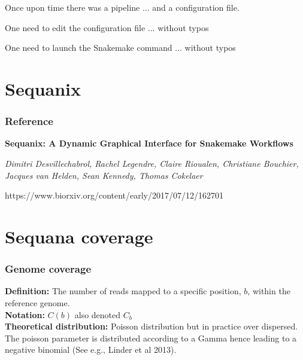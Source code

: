 \documentclass{beamer}
\begin{document}
\begin{frame}
 
Once upon time there was a pipeline ... and a configuration file.

\vspace{1cm}
\pause


One need to edit the configuration file ... without typos 
 
 \vspace{1cm}
\pause

One need to launch the Snakemake command ... without typos
 
\end{frame}


\section{Sequanix}


\begin{frame}
\frametitle{Reference} 
 
\textbf{Sequanix: A Dynamic Graphical Interface for Snakemake Workflows} 

\vspace{.5cm}

\textit{Dimitri Desvillechabrol, Rachel Legendre, Claire Rioualen, Christiane 
Bouchier, Jacques van Helden, Sean Kennedy, Thomas Cokelaer}

\vspace{.5cm}
 
https://www.biorxiv.org/content/early/2017/07/12/162701
 
\end{frame}


 
\section{Sequana coverage}


\begin{frame}
\frametitle{Genome coverage}

\textbf{Definition:} The number of reads mapped to a specific position, $b$, 
within the reference genome. \\
\vspace{1em}
\textbf{Notation:} $ C(b)$ also denoted $C_b$\\
\vspace{1em}
\textbf{Theoretical distribution:} Poisson distribution but in practice over 
dispersed. The poisson parameter is distributed according to a Gamma hence 
leading to a negative binomial (See e.g., Linder et al 2013).
\end{frame}
\end{document}
